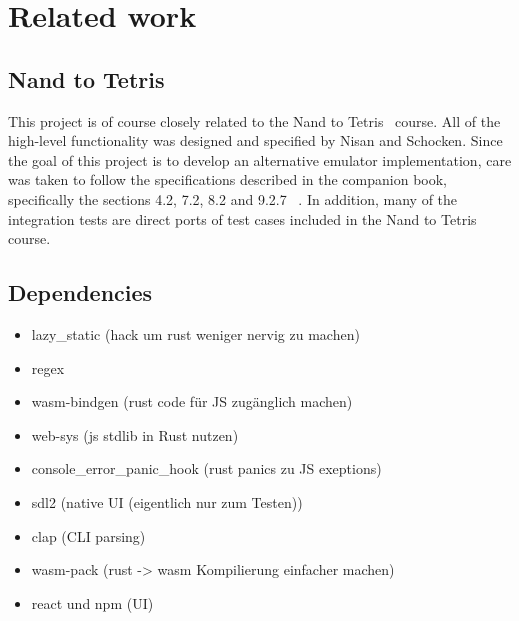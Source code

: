 \section{Related work}

\subsection{Nand to Tetris}

This project is of course closely related to the Nand to Tetris~\cite{n2tweb} course. All of the high-level functionality was designed and specified by Nisan and Schocken.
Since the goal of this project is to develop an alternative emulator implementation, care was taken to follow the specifications described in the companion book, specifically the sections 4.2, 7.2, 8.2 and 9.2.7  ~\cite{nisan2005}.
In addition, many of the integration tests are direct ports of test cases included in the Nand to Tetris course.


\subsection{Dependencies}

\begin{itemize}
\item lazy\_static (hack um rust weniger nervig zu machen)
\item regex
\item wasm-bindgen (rust code für JS zugänglich machen)
\item web-sys (js stdlib in Rust nutzen)
\item console\_error\_panic\_hook (rust panics zu JS exeptions)
\item sdl2 (native UI (eigentlich nur zum Testen))
\item clap (CLI parsing)
\item wasm-pack (rust -> wasm Kompilierung einfacher machen)
\item react und npm (UI)
\end{itemize}

